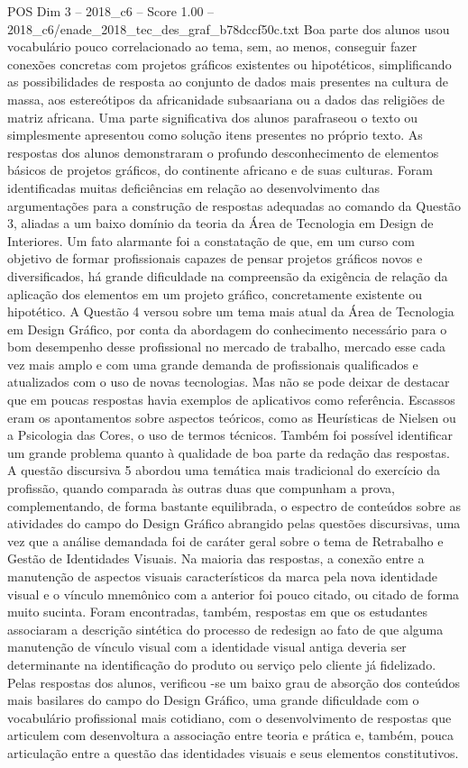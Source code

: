 \begin{textsample}{POS Dim 3 – 2018\_c6 – Score 1.00 – 2018\_c6/enade\_2018\_tec\_des\_graf\_b78dccf50c.txt}
Boa parte dos alunos usou vocabulário pouco correlacionado ao tema, sem, ao menos, conseguir fazer conexões concretas com projetos gráficos existentes ou hipotéticos, simplificando as possibilidades de resposta ao conjunto de dados mais presentes na cultura de massa, aos estereótipos da africanidade subsaariana ou a dados das religiões de matriz africana.
Uma parte significativa dos alunos parafraseou o texto ou simplesmente apresentou como solução itens presentes no próprio texto.
As respostas dos alunos demonstraram o profundo desconhecimento de elementos básicos de projetos gráficos, do continente africano e de suas culturas.
Foram identificadas muitas deficiências em relação ao desenvolvimento das argumentações para a construção de respostas adequadas ao comando da Questão 3, aliadas a um baixo domínio da teoria da Área de Tecnologia em Design de Interiores.
Um fato alarmante foi a constatação de que, em um curso com objetivo de formar profissionais capazes de pensar projetos gráficos novos e diversificados, há grande dificuldade na compreensão da exigência de relação da aplicação dos elementos em um projeto gráfico, concretamente existente ou hipotético.
A Questão 4 versou sobre um tema mais atual da Área de Tecnologia em Design Gráfico, por conta da abordagem do conhecimento necessário para o bom desempenho desse profissional no mercado de trabalho, mercado esse cada vez mais amplo e com uma grande demanda de profissionais qualificados e atualizados com o uso de novas tecnologias.
Mas não se pode deixar de destacar que em poucas respostas havia exemplos de aplicativos como referência.
Escassos eram os apontamentos sobre aspectos teóricos, como as Heurísticas de Nielsen ou a Psicologia das Cores, o uso de termos técnicos.
Também foi possível identificar um grande problema quanto à qualidade de boa parte da redação das respostas.
A questão discursiva 5 abordou uma temática mais tradicional do exercício da profissão, quando comparada às outras duas que compunham a prova, complementando, de forma bastante equilibrada, o espectro de conteúdos sobre as atividades do campo do Design Gráfico abrangido pelas questões discursivas, uma vez que a análise demandada foi de caráter geral sobre o tema de Retrabalho e Gestão de Identidades Visuais.
Na maioria das respostas, a conexão entre a manutenção de aspectos visuais característicos da marca pela nova identidade visual e o vínculo mnemônico com a anterior foi pouco citado, ou citado de forma muito sucinta.
Foram encontradas, também, respostas em que os estudantes associaram a descrição sintética do processo de redesign ao fato de que alguma manutenção de vínculo visual com a identidade visual antiga deveria ser determinante na identificação do produto ou serviço pelo cliente já fidelizado.
Pelas respostas dos alunos, verificou -se um baixo grau de absorção dos conteúdos mais basilares do campo do Design Gráfico, uma grande dificuldade com o vocabulário profissional mais cotidiano, com o desenvolvimento de respostas que articulem com desenvoltura a associação entre teoria e prática e, também, pouca articulação entre a questão das identidades visuais e seus elementos constitutivos.

\end{textsample}
